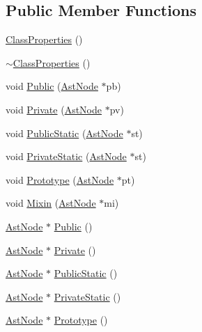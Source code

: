 \subsection*{Public Member Functions}
\begin{DoxyCompactItemize}
\item 
\hyperlink{classmocha_1_1_class_properties_aa76d79c7e3208f81b501ecd31b292cd7}{ClassProperties} ()
\item 
\hyperlink{classmocha_1_1_class_properties_a252add584fe17efdc8ffcec1e2e671c2}{$\sim$ClassProperties} ()
\item 
void \hyperlink{classmocha_1_1_class_properties_ae945b72acc7f9a701f9a61e00a3ec9dc}{Public} (\hyperlink{classmocha_1_1_ast_node}{AstNode} $\ast$pb)
\item 
void \hyperlink{classmocha_1_1_class_properties_adc301e4d0c434d6537d101fc23db19d3}{Private} (\hyperlink{classmocha_1_1_ast_node}{AstNode} $\ast$pv)
\item 
void \hyperlink{classmocha_1_1_class_properties_a2b60d8c5f8b29d998cd74c3e4b767658}{PublicStatic} (\hyperlink{classmocha_1_1_ast_node}{AstNode} $\ast$st)
\item 
void \hyperlink{classmocha_1_1_class_properties_aff4897dba124ff17be9ea89b66d90964}{PrivateStatic} (\hyperlink{classmocha_1_1_ast_node}{AstNode} $\ast$st)
\item 
void \hyperlink{classmocha_1_1_class_properties_af59dbd12054895607ef186c44a59f2af}{Prototype} (\hyperlink{classmocha_1_1_ast_node}{AstNode} $\ast$pt)
\item 
void \hyperlink{classmocha_1_1_class_properties_accf89b68e8f8882a8fdc6451316847a0}{Mixin} (\hyperlink{classmocha_1_1_ast_node}{AstNode} $\ast$mi)
\item 
\hyperlink{classmocha_1_1_ast_node}{AstNode} $\ast$ \hyperlink{classmocha_1_1_class_properties_adc8886e8e84e5dfcff2c53224a8ba3a7}{Public} ()
\item 
\hyperlink{classmocha_1_1_ast_node}{AstNode} $\ast$ \hyperlink{classmocha_1_1_class_properties_af9fa75e37144848c4afef0c94c8cd905}{Private} ()
\item 
\hyperlink{classmocha_1_1_ast_node}{AstNode} $\ast$ \hyperlink{classmocha_1_1_class_properties_a771429cd4e5d42ec660e5195df36962a}{PublicStatic} ()
\item 
\hyperlink{classmocha_1_1_ast_node}{AstNode} $\ast$ \hyperlink{classmocha_1_1_class_properties_a5923c53b284aef2acbda68d22a97ad37}{PrivateStatic} ()
\item 
\hyperlink{classmocha_1_1_ast_node}{AstNode} $\ast$ \hyperlink{classmocha_1_1_class_properties_ad0b98aab0fce334e77e55af9ac07dd08}{Prototype} ()

\end{DoxyCompactItemize}

